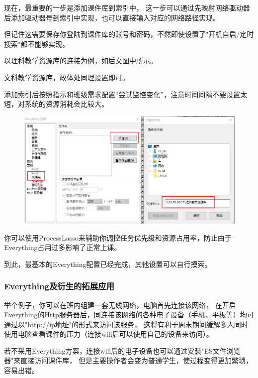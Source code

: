 \documentclass[a5paper]{article}
\begin{document}
            现在，最重要的一步是添加课件库到索引中，
            这一步可以通过先映射网络驱动器后添加驱动器号到索引中实现，也可以直接输入对应的网络路径实现。
            
            但记住这需要保存你登陆到课件库的账号和密码，不然即使设置了"开机自启/定时搜索"都不能够实现。
            
            以理科教学资源库的连接为例，如后文图中所示。

            文科教学资源库，政体处同理设置即可。

            添加索引后按照指示和班级需求配置“尝试监控变化”，注意时间间隔不要设置太短，对系统的资源消耗会比较大。

            \begin{figure}[htbp]
            \centering
            \includegraphics[scale=0.3]{2.1-p3.png}
            \end{figure}

            你可以使用ProcessLasso来辅助你调控任务优先级和资源占用率，防止由于Everything占用过多影响了正常上课。

            到此，最基本的Everything配置已经完成，其他设置可以自行摸索。
            
        \subsubsection{Everything及衍生的拓展应用}
        举个例子，你可以在班内组建一套无线网络，电脑首先连接该网络，
        在开启Everything的Http服务器后，同连接该网络的各种电子设备（手机，平板等）均可通过以"http://ip地址"的形式来访问该服务，
        这将有利于周末期间缓解多人同时使用电脑查看课件的压力（连接wifi后可以使用自己的设备来访问）。
        
        若不采用Everything方案，连接wifi后的电子设备也可以通过安装"ES文件浏览器"来直接访问课件库，
        但是主要操作者会变为普通学生，使过程变得更加繁琐，容易出错。
        
\end{document}
